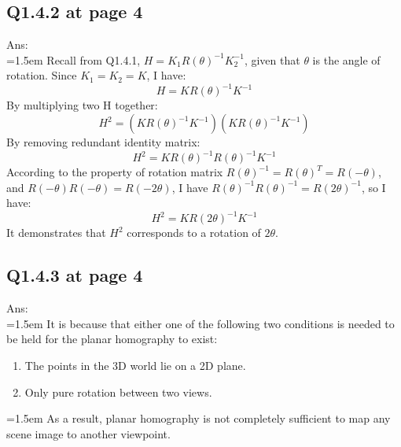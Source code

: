 \documentclass{article}
\begin{document}
	\subsection*{Q1.4.2 at page 4}
	Ans:\\
	\hangindent=1.5em \hspace{1.5em} Recall from Q1.4.1, $H = K_1R(\theta)^{-1}K_2^{-1}$, given that $\theta$ is the angle of rotation. Since $K_1=K_2=K$, I have:
	\begin{equation}
		H = K R(\theta)^{-1} K^{-1}
	\end{equation}
	By multiplying two H together:
	\begin{equation}
		H^2 = (K R(\theta)^{-1} K^{-1})  (K R(\theta)^{-1} K^{-1})
	\end{equation}
	By removing redundant identity matrix:
	\begin{equation}
		H^2 = K R(\theta)^{-1} R(\theta)^{-1} K^{-1}
	\end{equation}
	According to the property of rotation matrix $R(\theta)^{-1}=R(\theta)^T=R(-\theta)$, and $R(-\theta) R(-\theta) = R(-2\theta)$, I have $R(\theta)^{-1} R(\theta)^{-1} = R(2\theta)^{-1}$, so I have:
	\begin{equation}
		H^2 = K R(2\theta)^{-1} K^{-1}
	\end{equation}
	It demonstrates that $H^2$ corresponds to a rotation of $2\theta$.
	
	\newpage
	\subsection*{Q1.4.3 at page 4}
	Ans:\\
	\hangindent=1.5em \hspace{1.5em} It is because that either one of the following two conditions is needed to be held for the planar homography to exist:
	\begin{enumerate}
		\item The points in the 3D world lie on a 2D plane.
		\item Only pure rotation between two views.
	\end{enumerate}
	\hangindent=1.5em \hspace{1.5em} As a result, planar homography is not completely sufficient to map any scene image to another viewpoint.
	
	\newpage
\end{document}
